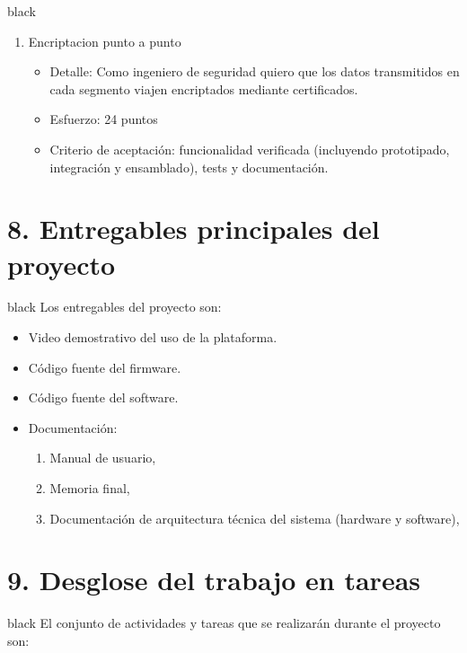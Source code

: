 \documentclass[
11pt, %
]{charter}
\begin{document}
\begin{consigna}{black}
\begin{enumerate}
	\item Encriptacion punto a punto
	\begin{itemize}
		\item Detalle: Como ingeniero de seguridad quiero que los datos transmitidos en cada segmento viajen encriptados mediante certificados.
		\item Esfuerzo: 24 puntos
		\item Criterio de aceptación: funcionalidad verificada (incluyendo prototipado, integración y ensamblado), tests y documentación.
	\end{itemize}
	
\end{enumerate}
\end{consigna}



\section{8. Entregables principales del proyecto}
\label{sec:entregables}
\begin{consigna}{black}
Los entregables del proyecto son:
\begin{itemize}
	\item Video demostrativo del uso de la plataforma. 		
	\item Código fuente del firmware.
	\item Código fuente del software.
	\item Documentación:
	\begin{enumerate}				
		\item Manual de usuario,			
		\item Memoria final,
		\item Documentación de arquitectura técnica del sistema (hardware y software),
	\end{enumerate}	
	

\end{itemize}
\end{consigna}

\section{9. Desglose del trabajo en tareas}
\label{sec:wbs}

\begin{consigna}{black}
El conjunto de actividades y tareas que se realizarán durante el proyecto son:


\end{consigna}
\end{document}
